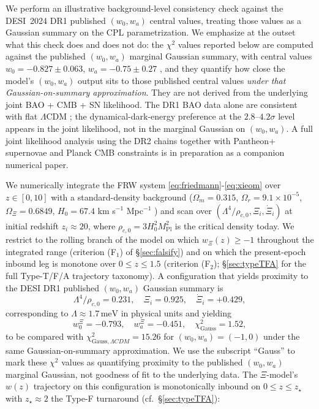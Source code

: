 \documentclass[11pt,reqno]{amsart}
\theoremstyle{plain}
\theoremstyle{definition}
\theoremstyle{remark}
\newcommand{\Pl}{\mathrm{Pl}}
\begin{document}
We perform an illustrative background-level consistency check against
the DESI~2024 DR1 published $(w_0, w_a)$ central values, treating those
values as a Gaussian summary on the CPL parametrization. We emphasize at
the outset what this check does and does not do: the
$\chi^{2}$ values reported below are computed against the published
$(w_0, w_a)$ marginal Gaussian summary, with central values
$w_0 = -0.827 \pm 0.063$, $w_a = -0.75 \pm 0.27$ \cite{DESI2024VI}, and
they quantify how close the model's $(w_0, w_a)$ output sits to those
published central values \emph{under that Gaussian-on-summary
approximation}. They are not derived from the underlying joint
BAO + CMB + SN likelihood. The DR1 BAO data alone are consistent with
flat $\Lambda$CDM \cite{DESI2024BAO}; the dynamical-dark-energy
preference at the $2.8$--$4.2\sigma$ level appears in the joint
likelihood, not in the marginal Gaussian on $(w_0, w_a)$. A full joint
likelihood analysis using the DR2 chains \cite{DESI2025DR2} together
with Pantheon+ supernovae and Planck CMB constraints is in preparation
as a companion numerical paper.

We numerically integrate the FRW system
\eqref{eq:friedmann}-\eqref{eq:xieom} over $z \in [0, 10]$ with a
standard-density background ($\Omega_m = 0.315$, $\Omega_r = 9.1\times10^{-5}$,
$\Omega_\Xi = 0.6849$, $H_0 = 67.4$ km s$^{-1}$ Mpc$^{-1}$
\cite{Planck2020}) and scan over $(\Lambda^{4}/\rho_{c,0}, \Xi_i, \dot\Xi_i)$
at initial redshift $z_i \approx 20$, where $\rho_{c,0} = 3 H_0^{2} M_\Pl^{2}$
is the critical density today. We restrict to the rolling branch of the
model on which $w_\Xi(z) \geq -1$ throughout the integrated range
(criterion (F$_1$) of \S\ref{sec:falsify}) and on which the present-epoch
inbound leg is monotone over $0 \leq z \leq 1.5$ (criterion (F$_2$);
\S\ref{sec:typeTFA} for the full Type-T/F/A trajectory taxonomy).
A configuration that yields proximity to the DESI DR1 published
$(w_0, w_a)$ Gaussian summary is
\begin{equation}\label{eq:desibestfit}
  \Lambda^{4}/\rho_{c,0} = 0.231,
  \quad \Xi_i = 0.925,
  \quad \dot\Xi_i = +0.429,
\end{equation}
corresponding to $\Lambda \approx 1.7\,\text{meV}$ in physical units and
yielding
\[
  w_0^{\Xi} = -0.793,\quad
  w_a^{\Xi} = -0.451,\quad
  \chi^{2}_{\text{Gauss}} = 1.52,
\]
to be compared with $\chi^{2}_{\text{Gauss},\Lambda CDM} = 15.26$ for
$(w_0, w_a) = (-1, 0)$ under the same Gaussian-on-summary
approximation. We use the subscript ``Gauss'' to mark these
$\chi^{2}$ values as quantifying proximity to the published
$(w_0, w_a)$ marginal Gaussian, not goodness of fit to the underlying
data. The $\Xi$-model's $w(z)$ trajectory on this configuration is
monotonically inbound on $0 \leq z \leq z_\star$ with $z_\star \approx 2$
the Type-F turnaround (cf.\ \S\ref{sec:typeTFA}):
\end{document}
